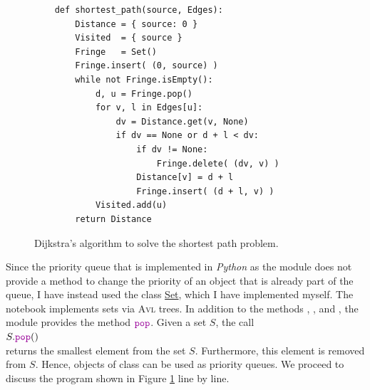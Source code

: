 \begin{figure}[!ht]
\centering
\begin{verbatim}
    def shortest_path(source, Edges):
        Distance = { source: 0 }
        Visited  = { source }
        Fringe   = Set()
        Fringe.insert( (0, source) )
        while not Fringe.isEmpty():
            d, u = Fringe.pop()
            for v, l in Edges[u]:
                dv = Distance.get(v, None)
                if dv == None or d + l < dv:
                    if dv != None:
                        Fringe.delete( (dv, v) )
                    Distance[v] = d + l
                    Fringe.insert( (d + l, v) )
            Visited.add(u)
        return Distance
\end{verbatim}
\vspace*{-0.3cm}
\caption{Dijkstra's algorithm to solve the shortest path problem.}
\label{fig:Dijkstra.ipynb}
\end{figure}
Since the priority queue that is implemented in \textsl{Python} as the module  does not provide a
method to change the priority of an object that is already part of the queue, I have instead used the class
\href{https://github.com/karlstroetmann/Algorithms/blob/master/Python/Chapter-11/Set.ipynb}{Set}, which I have implemented
myself.  The notebook  implements sets via \textsc{Avl} trees.  In addition to the methods
, , and , the module  provides the method
$\mytt{pop}$.  Given a set $S$, the call
\\[0.2cm]
\hspace*{1.3cm}
$S.\mytt{pop}()$
\\[0.2cm]
returns the smallest element from the set $S$.  Furthermore, this element is removed from $S$.
Hence, objects of class  can be used as priority queues.
We proceed to discuss the program shown in Figure \ref{fig:Dijkstra.ipynb} line by line.
